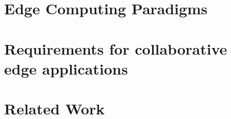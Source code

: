 %

\chapter{Edge Computing Paradigms}
\label{ch:edge-computing}


\chapter{Requirements for collaborative edge applications}
\label{ch:requirements}


\chapter{Related Work}
\label{ch:related-work}
